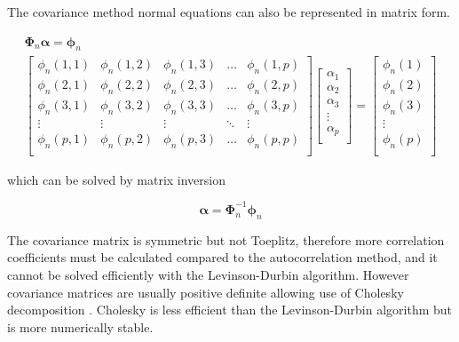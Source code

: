  The covariance method normal equations can also be represented in matrix form.
 
 \begin{eqnarray}
 	\boldsymbol{\Phi}_n \boldsymbol{\alpha} = \boldsymbol{\phi}_n \\
 	\begin{bmatrix} 
 		\phi_n(1,1)   & \phi_n(1,2)   & \phi_n(1,3)     & \dots    & \phi_n(1,p)  \\
 		\phi_n(2,1)   & \phi_n(2,2)  & \phi_n(2,3)     & \dots     & \phi_n(2,p)  \\
 		\phi_n(3,1)   & \phi_n(3,2)  & \phi_n(3,3)     & \dots    & \phi_n(3,p)  \\
 		\vdots      & \vdots      & \vdots          & \ddots  & \vdots  \\
 		\phi_n(p,1)  & \phi_n(p,2)  & \phi_n(p,3)      & \dots    & \phi_n(p,p)  \\
 	\end{bmatrix} 
 	\begin{bmatrix}
 		\alpha_1 \\
 		\alpha_2 \\
 		\alpha_3 \\
 		\vdots    \\
 		\alpha_p \\
 	\end{bmatrix}
 	=
 	\begin{bmatrix}
 		\phi_n(1)  \\
 		\phi_n(2) \\
 		\phi_n(3) \\
 		\vdots    \\
 		\phi_n(p) \\
 	\end{bmatrix}
 \end{eqnarray}
 
 \noindent
which can be solved by matrix inversion
 
 \begin{equation}
 	\boldsymbol{\alpha} = \boldsymbol{\Phi}_n^{-1} \boldsymbol{\phi}_n
 \end{equation}
 
The covariance matrix is symmetric but not Toeplitz, therefore more correlation coefficients must be calculated compared to the autocorrelation method, and it cannot be solved efficiently with the Levinson-Durbin algorithm. However covariance matrices are usually positive definite allowing use of Cholesky decomposition \citep[][chapter 5]{reilly2025fundamentals}. Cholesky is less efficient than the Levinson-Durbin algorithm but is more numerically stable.


